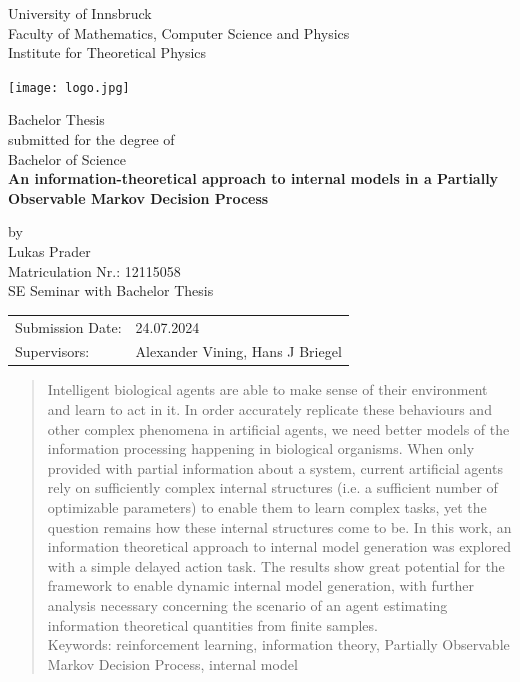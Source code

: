 \documentclass[12pt,a4paper]{article}
\begin{document}
\def\findate{24.07.2024}


\thispagestyle{empty}
\begin{center}
    \Large{University of Innsbruck \\ Faculty of Mathematics, Computer Science and Physics} \\
    \vspace{3mm}
    \large{Institute for Theoretical Physics}
    \vspace{10mm}

    \texttt{[image: logo.jpg]}

    \vspace{10mm}
    \Large{Bachelor Thesis} \\
    \large{submitted for the degree of} \\
    \Large{Bachelor of Science} \\
    \vspace{10mm}
    \LARGE{\textbf{An information-theoretical approach to internal models in a Partially Observable Markov Decision Process}} \\
    \vspace{10mm}

    \large{by \\ Lukas Prader \\ Matriculation Nr.: 12115058 \\ SE Seminar with Bachelor Thesis}
\end{center}

\vspace{30mm}
\begin{tabular}{ll}
    \large{Submission Date:} & \large{\findate}                          \\
    \large{Supervisors:}     & \large{Alexander Vining, Hans J  Briegel} \\
\end{tabular}


\newpage
\thispagestyle{empty}
\begin{abstract}
    \noindent Intelligent biological agents are able to make sense of their environment and learn to act in it.
    In order accurately replicate these behaviours and other complex phenomena in artificial agents, we need better models of the information processing happening in biological organisms.
    When only provided with partial information about a system, current artificial agents rely on sufficiently complex internal structures (i.e. a sufficient number of optimizable parameters) to enable them to learn complex tasks, yet the question remains how these internal structures come to be.
    In this work, an information theoretical approach to internal model generation was explored with a simple delayed action task.
    The results show great potential for the framework to enable dynamic internal model generation, with further analysis necessary concerning the scenario of an agent estimating information theoretical quantities from finite samples.\\

    \noindent Keywords: reinforcement learning, information theory, Partially Observable Markov Decision Process, internal model
\end{abstract}
\end{document}
